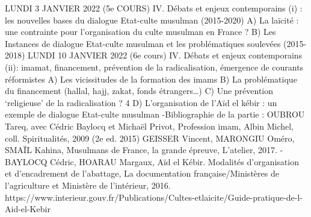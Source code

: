 LUNDI 3 JANVIER 2022 (5e COURS)
IV. Débats et enjeux contemporains (i) : les nouvelles bases du dialogue Etat-culte
musulman (2015-2020)
A) La laïcité : une contrainte pour l’organisation du culte musulman en France ?
B) Les Instances de dialogue Etat-culte musulman et les problématiques
soulevées (2015-2018)
LUNDI 10 JANVIER 2022 (6e
cours)
IV. Débats et enjeux contemporains (ii): imamat, financement, prévention de la
radicalisation, émergence de courants réformistes
A) Les vicissitudes de la formation des imams
B) La problématique du financement (hallal, hajj, zakat, fonds étrangers…)
C) Une prévention ‘religieuse’ de la radicalisation ?
4
D) L’organisation de l’Aïd el kébir : un exemple de dialogue Etat-culte
musulman
-Bibliographie de la partie :
OUBROU Tareq, avec Cédric Baylocq et Michaël Privot, Profession imam, Albin
Michel, coll. Spiritualités, 2009 (2e
ed. 2015)
GEISSER Vincent, MARONGIU Oméro, SMAÏL Kahina, Musulmans de France, la
grande épreuve, L’atelier, 2017.
-BAYLOCQ Cédric, HOARAU Margaux, Aïd el Kébir. Modalités d’organisation et
d’encadrement de l’abattage, La documentation française/Ministères de l’agriculture et
Ministère de l’intérieur, 2016. https://www.interieur.gouv.fr/Publications/Cultes-etlaicite/Guide-pratique-de-l-Aid-el-Kebir